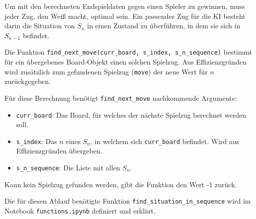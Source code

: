 \documentclass[12pt]{article}
\begin{document}
Um mit den berechneten Endspieldaten gegen einen Spieler zu gewinnen,
muss jeder Zug, den Weiß macht, optimal sein. Ein passender Zug für die
KI besteht darin die Situation von \(S_n\) in einen Zustand zu
überführen, in dem sie sich in \(S_{n-1}\) befindet.

Die Funktion
\texttt{find\_next\_move(curr\_board,\ s\_index,\ s\_n\_sequence)}
bestimmt für ein übergebenes Board-Objekt einen solchen Spielzug. Aus
Effizienzgründen wird zusätzlich zum gefundenen Spielzug (\texttt{move})
der neue Wert für \(n\) zurückgegeben.

Für diese Berechnung benötigt \texttt{find\_next\_move} nachkommende
Argumente:
\begin{itemize}
	\item \texttt{curr\_board}: Das Board, für welches der nächste
	Spielzug berechnet werden soll. 
	\item \texttt{s\_index}: Das \(n\) eines
	\(S_n\), in welchem sich \texttt{curr\_board} befindet. Wird aus
	Effizienzgründen übergeben.
	\item \texttt{s\_n\_sequence}: Die Liste mit
	allen \(S_n\).
\end{itemize}

Kann kein Spielzug gefunden werden, gibt die Funktion den Wert -1
zurück.

Die für diesen Ablauf benötigte Funktion
\texttt{find\_situation\_in\_sequence} wird im Notebook
\texttt{functions.ipynb} definiert und erklärt.
\end{document}
